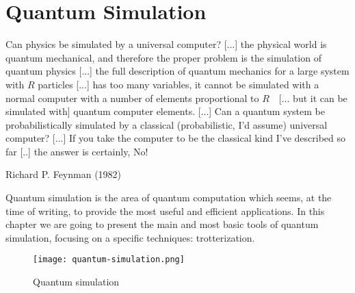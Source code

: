\chapter{Quantum Simulation}\label{chap:2}
\epigraph{Can physics be simulated by a universal computer? [...] the physical world is quantum mechanical, and therefore the proper problem is the simulation of quantum physics [...] the full description of quantum mechanics for a large system with $R$ particles [...] has too many variables, it cannot be simulated with a normal computer with a number of elements proportional to $R \quad[\ldots$ but it can be simulated with] quantum computer elements. [...] Can a quantum system be probabilistically simulated by a classical (probabilistic, I'd assume) universal computer? [...] If you take the computer to be the classical kind I've described so far [..] the answer is certainly, No!}{Richard P. Feynman (1982)}
Quantum simulation is the area of quantum computation which seems, at the time of writing, to provide the most useful and efficient applications. In this chapter we are going to present the main and most basic tools of quantum simulation, focusing on a specific techniques: trotterization. 

\begin{figure}[htb]
\texttt{[image: quantum-simulation.png]}
\centering
\caption{Quantum simulation}
\end{figure}

    




